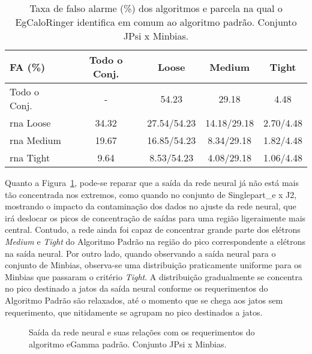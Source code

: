\begin{table}[htb]
\centering
\begin{tabular}{l cccc}
\hline
\hline
FA (\%)& Todo o Conj. & Loose & Medium & Tight \\
\hline
Todo o Conj.    &  -    & 54.23       & 29.18       & 4.48      \\
\gls{rna} Loose & 34.32 & 27.54/54.23 & 14.18/29.18 & 2.70/4.48 \\
\gls{rna} Medium& 19.67 & 16.85/54.23 & 8.34/29.18  & 1.82/4.48 \\
\gls{rna} Tight & 9.64  & 8.53/54.23  & 4.08/29.18  & 1.06/4.48 \\
\hline
\hline
\end{tabular}
\caption{Taxa de falso alarme (\%) dos algoritmos e parcela na qual o EgCaloRinger
identifica em comum ao algoritmo padrão. Conjunto JPsi x Minbias.}
\label{tab:jpsixminb_efic_fa}
\end{table}

Quanto a Figura~\ref{fig:jpsixminb_saidaneural}, pode-se reparar que a saída da
rede neural já não está mais tão concentrada nos extremos, como quando no
conjunto de Singlepart\_e x J2, mostrando o impacto da contaminação dos dados no
ajuste da rede neural, que irá deslocar os picos de concentração de saídas para
uma região ligeraimente mais central. Contudo, a rede ainda foi capaz de
concentrar grande parte dos elétrons \emph{Medium} e \emph{Tight} do Algoritmo
Padrão na região do pico correspondente a elétrons na saída neural. Por outro
lado, quando observando a saída neural para o conjunto de Minbias, observa-se
uma distribuição praticamente uniforme para os Minbias que passaram o critério
\emph{Tight}. A distribuição gradualmente se concentra no pico destinado a jatos
da saída neural conforme os requerimentos do Algoritmo Padrão são relaxados,
até o momento que se chega aos jatos sem requerimento, que nitidamente se agrupam 
no pico destinados a jatos.

\begin{figure}[ht]
\centering
{}
\label{fig:jpsixminb_saidaneural}
\caption{Saída da rede neural e suas relações com os requerimentos do algoritmo
eGamma padrão. Conjunto JPsi x Minbias.}
\end{figure}

